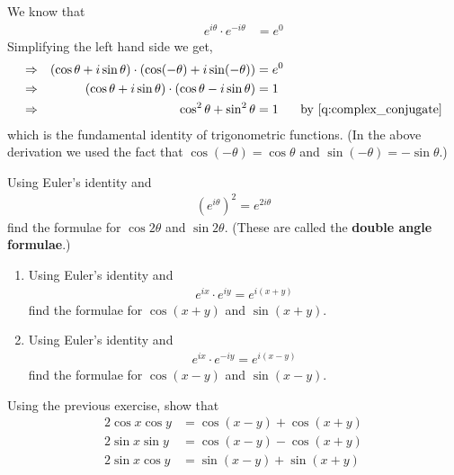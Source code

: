 \begin{example}
	We know that
	\begin{align*}
		&& e^{i \theta} \cdot e^{-i \theta} &= e^0
	\end{align*}
	Simplifying the left hand side we get,
	\begin{align*}
		\Rightarrow
		&&
		(\cos \theta + i \sin \theta) \cdot (\cos (-\theta) + i \sin (-\theta)) &= e^0  \\
		\Rightarrow
		&&
		(\cos \theta + i \sin \theta) \cdot (\cos \theta - i \sin \theta) &= 1  \\
		\Rightarrow &&
		\cos^2 \theta + \sin^2 \theta
		&= 1 & \mbox{ by \eqref{q:complex_conjugate}}
	\end{align*}
	which is the fundamental identity of trigonometric functions.
	(In the above derivation we used the fact that $\cos(-\theta) = \cos \theta$ and $\sin (-\theta) = - \sin \theta$.)
\end{example}

\begin{exercise}
	Using Euler's identity and
	\begin{align*}
		\left(e^{i \theta}\right)^2 = e^{2i \theta}
	\end{align*}
	find the formulae for $\cos 2 \theta$ and $\sin 2 \theta$. (These are called the {\bf double angle formulae}.)
\end{exercise}

\begin{exercise}
	\begin{enumerate}
		\item
		Using Euler's identity and
		\begin{align*}
			e^{i x} \cdot e^{i y}  = e^{i (x + y)}
		\end{align*}
		find the formulae for $\cos (x + y)$ and $\sin (x + y)$.
		\item
		Using Euler's identity and
		\begin{align*}
			e^{i x} \cdot e^{-i y}  = e^{i (x - y)}
		\end{align*}
		find the formulae for $\cos (x - y)$ and $\sin (x - y)$.
	\end{enumerate}
\end{exercise}


\begin{exercise}
	Using the previous exercise, show that
 \begin{align*}
		 2 \cos x \cos y &= \cos (x-y) + \cos(x+y) \\
	 2 \sin x \sin y &= \cos (x-y) - \cos(x+y)\\
		2 \sin x \cos y &= \sin (x-y) + \sin(x+y)
 \end{align*}
\end{exercise}

